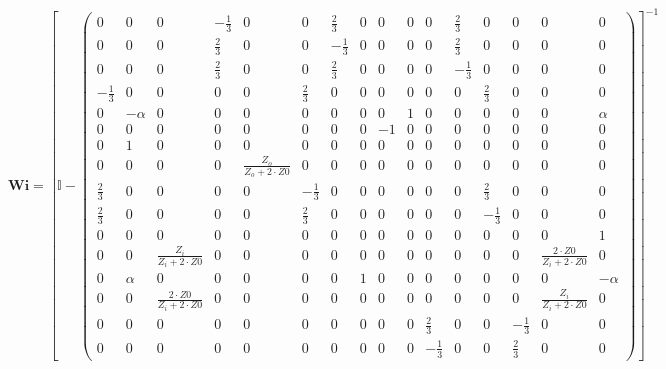 \[ \mathbf{Wi} =  \left[ \mathbb{I}  - \left(\begin{smallmatrix} 0 & 0 & 0 & -\frac{1}{3} & 0 & 0 & \frac{2}{3} & 0 & 0 & 0 & 0 & \frac{2}{3} & 0 & 0 & 0 & 0 \\ 0 & 0 & 0 & \frac{2}{3} & 0 & 0 & -\frac{1}{3} & 0 & 0 & 0 & 0 & \frac{2}{3} & 0 & 0 & 0 & 0 \\ 0 & 0 & 0 & \frac{2}{3} & 0 & 0 & \frac{2}{3} & 0 & 0 & 0 & 0 & -\frac{1}{3} & 0 & 0 & 0 & 0 \\ -\frac{1}{3} & 0 & 0 & 0 & 0 & \frac{2}{3} & 0 & 0 & 0 & 0 & 0 & 0 & \frac{2}{3} & 0 & 0 & 0 \\ 0 & -\alpha & 0 & 0 & 0 & 0 & 0 & 0 & 0 & 1 & 0 & 0 & 0 & 0 & 0 & \alpha \\ 0 & 0 & 0 & 0 & 0 & 0 & 0 & 0 & -1 & 0 & 0 & 0 & 0 & 0 & 0 & 0 \\ 0 & 1 & 0 & 0 & 0 & 0 & 0 & 0 & 0 & 0 & 0 & 0 & 0 & 0 & 0 & 0 \\ 0 & 0 & 0 & 0 & \frac{Z_o}{Z_o+2\cdot Z0} & 0 & 0 & 0 & 0 & 0 & 0 & 0 & 0 & 0 & 0 & 0 \\ \frac{2}{3} & 0 & 0 & 0 & 0 & -\frac{1}{3} & 0 & 0 & 0 & 0 & 0 & 0 & \frac{2}{3} & 0 & 0 & 0 \\ \frac{2}{3} & 0 & 0 & 0 & 0 & \frac{2}{3} & 0 & 0 & 0 & 0 & 0 & 0 & -\frac{1}{3} & 0 & 0 & 0 \\ 0 & 0 & 0 & 0 & 0 & 0 & 0 & 0 & 0 & 0 & 0 & 0 & 0 & 0 & 0 & 1 \\ 0 & 0 & \frac{Z_i}{Z_i+2\cdot Z0} & 0 & 0 & 0 & 0 & 0 & 0 & 0 & 0 & 0 & 0 & 0 & \frac{2\cdot Z0}{Z_i+2\cdot Z0} & 0 \\ 0 & \alpha & 0 & 0 & 0 & 0 & 0 & 1 & 0 & 0 & 0 & 0 & 0 & 0 & 0 & -\alpha \\ 0 & 0 & \frac{2\cdot Z0}{Z_i+2\cdot Z0} & 0 & 0 & 0 & 0 & 0 & 0 & 0 & 0 & 0 & 0 & 0 & \frac{Z_i}{Z_i+2\cdot Z0} & 0 \\ 0 & 0 & 0 & 0 & 0 & 0 & 0 & 0 & 0 & 0 & \frac{2}{3} & 0 & 0 & -\frac{1}{3} & 0 & 0 \\ 0 & 0 & 0 & 0 & 0 & 0 & 0 & 0 & 0 & 0 & -\frac{1}{3} & 0 & 0 & \frac{2}{3} & 0 & 0 \end{smallmatrix}\right) \right]^{-1}  \]
